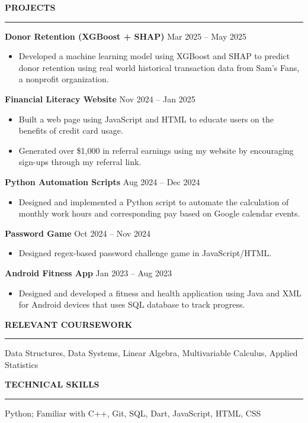 \documentclass[12pt]{article}
\newcommand{\resumeSection}[1]{\vspace{6pt}\noindent\textbf{\large #1}\vspace{3pt}\hrule\vspace{5pt}}
\newcommand{\resumeProject}[2]{
  \noindent\textbf{#1} \hfill #2
  \vspace{-1pt} %
}
\newenvironment{resumeItemize}{
  \begin{itemize}[leftmargin=0.15in, label={--}, itemsep=1pt, topsep=0pt]
}{\end{itemize}}
\begin{document}
\resumeSection{PROJECTS}

\resumeProject{Donor Retention (XGBoost + SHAP)}{Mar 2025 -- May 2025}
\begin{resumeItemize}
  \item Developed a machine learning model using XGBoost and SHAP to predict donor retention using real world historical transaction data from Sam’s Fans, a nonprofit organization.
\end{resumeItemize}

\resumeProject{Financial Literacy Website}{Nov 2024 -- Jan 2025}
\begin{resumeItemize}
  \item Built a web page using JavaScript and HTML to educate users on the benefits of credit card usage.
  \item Generated over \$1,000 in referral earnings using my website by encouraging sign-ups through my referral link.
\end{resumeItemize}

\resumeProject{Python Automation Scripts}{Aug 2024 -- Dec 2024}
\begin{resumeItemize}
  \item Designed and implemented a Python script to automate the calculation of monthly work hours and corresponding pay based on Google calendar events.
\end{resumeItemize}

\resumeProject{Password Game}{Oct 2024 -- Nov 2024}
\begin{resumeItemize}
  \item Designed regex-based password challenge game in JavaScript/HTML.
\end{resumeItemize}

\resumeProject{Android Fitness App}{Jan 2023 -- Aug 2023}
\begin{resumeItemize}
  \item Designed and developed a fitness and health application using Java and XML for Android devices that uses SQL database to track progress.
\end{resumeItemize}

\resumeSection{RELEVANT COURSEWORK}
Data Structures, Data Systems, Linear Algebra, Multivariable Calculus, Applied Statistics

\resumeSection{TECHNICAL SKILLS}
Python; Familiar with C++, Git, SQL, Dart, JavaScript, HTML, CSS
\end{document}
